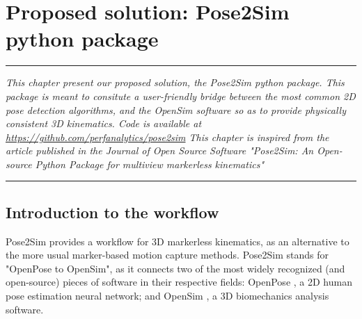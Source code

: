 
\lhead[\fancyplain{}{\leftmark}]%
      {\fancyplain{}{}} %
\chead[\fancyplain{}{}]%
      {\fancyplain{}{}}
\rhead[\fancyplain{}{}]%
      {\fancyplain{}{\rightmark}}%
\lfoot[\fancyplain{}{}]%
      {\fancyplain{}{}}
\cfoot[\fancyplain{}{\thepage}]%
      {\fancyplain{}{\thepage}} %
\rfoot[\fancyplain{}{}]%
     {\fancyplain{}{\scriptsize}}



\chapter[Pose2Sim]{Proposed solution: Pose2Sim python package}
\label{ch:3}


\begin{center}
\rule{0.7\linewidth}{.5pt}
\begin{minipage}{0.7\linewidth}
\smallskip

\textit{This chapter present our proposed solution, the Pose2Sim python package. This package is meant to consitute a user-friendly bridge between the most common 2D pose detection algorithms, and the OpenSim software so as to provide physically consistent 3D kinematics. Code is available at \url{https://github.com/perfanalytics/pose2sim} \newline \newline
This chapter is inspired from the article published in the Journal of Open Source Software "Pose2Sim: An Open-source Python Package for multiview markerless kinematics" \cite{Pagnon2022b} }

\end{minipage}
\smallskip
\rule{0.7\linewidth}{.5pt}
\end{center}

\minitoc
\newpage


\section{Introduction to the workflow}
Pose2Sim provides a workflow for 3D markerless kinematics, as an alternative to the more usual marker-based motion capture methods. Pose2Sim stands for "OpenPose to OpenSim", as it connects two of the most widely recognized (and open-source) pieces of software in their respective fields: OpenPose \cite{Cao2019}, a 2D human pose estimation neural network; and OpenSim \cite{Delp2007,Seth2018}, a 3D biomechanics analysis software.

